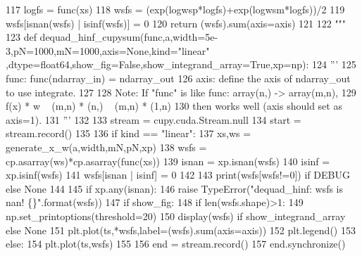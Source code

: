 \begin{DoxyCode}
117         logfs = func(xs)
118         wsfs = (exp(logwsp*logfs)+exp(logwsm*logfs))/2
119         wsfs[isnan(wsfs) | isinf(wsfs)] = 0
120         \textcolor{keywordflow}{return} (wsfs).sum(axis=axis)
121 
122 \textcolor{stringliteral}{"""}
123 \textcolor{stringliteral}{def dequad\_hinf\_cupysum(func,a,width=5e-3,pN=1000,mN=1000,axis=None,kind="linear"
      ,dtype=float64,show\_fig=False,show\_integrand\_array=True,xp=np):}
124 \textcolor{stringliteral}{    '''}
125 \textcolor{stringliteral}{    func: func(ndarray\_in) = ndarray\_out}
126 \textcolor{stringliteral}{    axis: define the axis of ndarray\_out to use integrate.}
127 \textcolor{stringliteral}{    }
128 \textcolor{stringliteral}{    Note: If "func" is like func: array(n,) -> array(m,n),}
129 \textcolor{stringliteral}{              f(x) * w ~ (m,n) * (n,) ~ (m,n) * (1,n)}
130 \textcolor{stringliteral}{          then works well (axis should set as axis=1). }
131 \textcolor{stringliteral}{    '''}
132 \textcolor{stringliteral}{    }
133 \textcolor{stringliteral}{    stream = cupy.cuda.Stream.null}
134 \textcolor{stringliteral}{    start = stream.record()}
135 \textcolor{stringliteral}{    }
136 \textcolor{stringliteral}{    if kind == "linear":}
137 \textcolor{stringliteral}{        xs,ws = generate\_x\_w(a,width,mN,pN,xp)}
138 \textcolor{stringliteral}{        wsfs = cp.asarray(ws)*cp.asarray(func(xs))}
139 \textcolor{stringliteral}{        isnan = xp.isnan(wsfs)}
140 \textcolor{stringliteral}{        isinf = xp.isinf(wsfs)}
141 \textcolor{stringliteral}{        wsfs[isnan | isinf] = 0}
142 \textcolor{stringliteral}{        }
143 \textcolor{stringliteral}{        print(wsfs[wsfs!=0]) if DEBUG else None}
144 \textcolor{stringliteral}{        }
145 \textcolor{stringliteral}{        if xp.any(isnan):}
146 \textcolor{stringliteral}{            raise TypeError("dequad\_hinf: wsfs is nan! \{\}".format(wsfs))}
147 \textcolor{stringliteral}{        if show\_fig:}
148 \textcolor{stringliteral}{            if len(wsfs.shape)>1:}
149 \textcolor{stringliteral}{                np.set\_printoptions(threshold=20)}
150 \textcolor{stringliteral}{                display(wsfs) if show\_integrand\_array else None}
151 \textcolor{stringliteral}{                plt.plot(ts,*wsfs,label=(wsfs).sum(axis=axis))}
152 \textcolor{stringliteral}{                plt.legend()}
153 \textcolor{stringliteral}{            else:}
154 \textcolor{stringliteral}{                plt.plot(ts,wsfs)}
155 \textcolor{stringliteral}{}
156 \textcolor{stringliteral}{        end = stream.record()}
157 \textcolor{stringliteral}{        end.synchronize()}

\end{DoxyCode}
